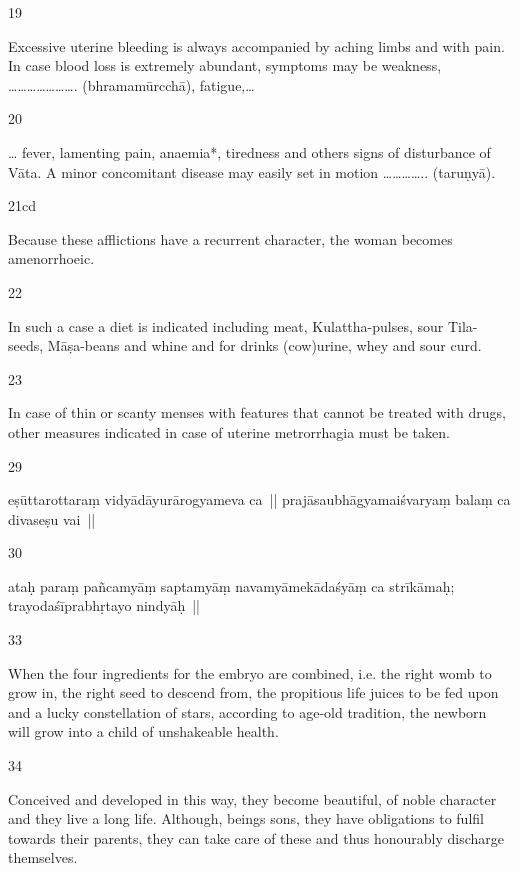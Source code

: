 \begin{translation}
\begin{tt}
\item[19]

 Excessive uterine bleeding is always accompanied by aching limbs and 
  with pain. In case blood loss is extremely abundant, symptoms may be 
  weakness, …………………. (bhramamūrcchā), fatigue,…
  
\item[20]

… fever, lamenting pain, anaemia*, tiredness and others signs of 
  disturbance of Vāta. A minor concomitant disease may easily set in motion 
  ………….. (taruṇyā).
  
\item[21cd]

Because these afflictions have a recurrent character, the woman 
  becomes amenorrhoeic. 
  
\item[22]

In such a case a diet is indicated including meat, Kulattha-pulses, sour 
  Tila-seeds, Māṣa-beans and whine and for drinks (cow)urine, whey and sour 
  curd.
  
\item[23]

In case of thin or scanty menses with features that cannot be treated 
  with drugs, other measures indicated in case of uterine metrorrhagia must be 
  taken. 
  
\item[29]


  eṣūttarottaraṃ vidyādāyurārogyameva ca || prajāsaubhāgyamaiśvaryaṃ balaṃ 
  ca divaseṣu vai ||
  
\item[30]


  ataḥ paraṃ pañcamyāṃ saptamyāṃ navamyāmekādaśyāṃ ca strīkāmaḥ; 
  trayodaśīprabhṛtayo nindyāḥ ||
  
\item[33]

 When the four ingredients for the embryo are combined, i.e. the right 
  womb to grow in, the right seed to descend from, the propitious life juices to be 
  fed upon and a lucky constellation of stars, according to age-old tradition, the 
  newborn will grow into a child of unshakeable health. 
  
\item[34]

Conceived and developed in this way, they become beautiful, of noble 
  character and they live a long life. Although, beings sons, they have obligations 
  to fulfil towards their parents, they can take care of these and thus honourably 
  discharge themselves.
  

\end{tt}
\end{translation}
